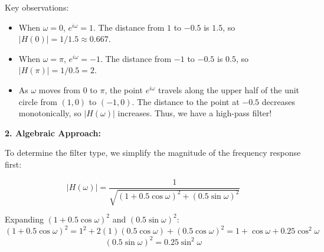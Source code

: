 \begin{enumerate}
{\begin{center}
\begin{Described}
\end{Described}
            \end{center}

            Key observations:
            \begin{itemize}
                \item When $\omega = 0$, $e^{i\omega} = 1$. The distance from $1$ to $-0.5$ is $1.5$, so $|H(0)| = 1/1.5 \approx 0.667$.
                \item When $\omega = \pi$, $e^{i\omega} = -1$. The distance from $-1$ to $-0.5$ is $0.5$, so $|H(\pi)| = 1/0.5 = 2$.
                \item As $\omega$ moves from $0$ to $\pi$, the point $e^{i\omega}$ travels along the upper half of the unit circle from $(1,0)$ to $(-1,0)$. 
                The distance to the point at $-0.5$ decreases monotonically, so $|H(\omega)|$ increases. Thus, we have a high-pass filter!\\
            \end{itemize}

            
            \textbf{2. Algebraic Approach:}
            
            To determine the filter type, we simplify the magnitude of the frequency response first:

            \[
            |H(\omega)| = \frac{1}{\sqrt{(1 + 0.5\cos\omega)^2 + (0.5\sin\omega)^2}}
            \]


            Expanding \( (1 + 0.5\cos\omega)^2 \) and \( (0.5\sin\omega)^2 \):
            \[
            (1 + 0.5\cos\omega)^2 = 1^2 + 2(1)(0.5\cos\omega) + (0.5\cos\omega)^2 = 1 + \cos\omega + 0.25\cos^2\omega
            \]
            \[
            (0.5\sin\omega)^2 = 0.25\sin^2\omega
            \]


}
\end{enumerate}
